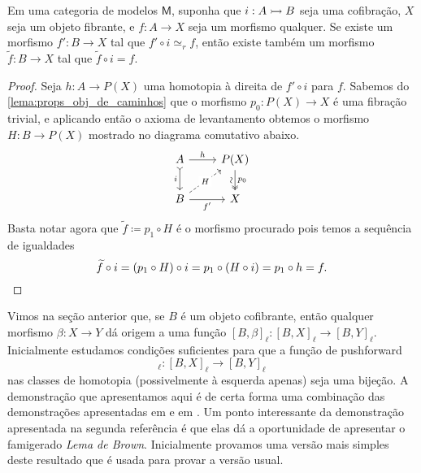 \begin{lema}
  \label{lema:extensao_a_menos_de_homotopia}
  Em uma categoria de modelos $\mathsf{M}$, suponha que $i: A \rightarrowtail B$ seja uma cofibração, $X$ seja um objeto fibrante, e $f: A \to X$ seja um morfismo qualquer.
  Se existe um morfismo $f': B \to X$ tal que $f' \circ i \simeq_{r} f$, então existe também um morfismo $\widetilde{f}: B \to X$ tal que $\widetilde{f} \circ i = f$.
\end{lema}

\begin{proof}
  Seja $h: A \to P(X)$ uma homotopia à direita de $f' \circ i $ para $f$.
  Sabemos do \cref{lema:props_obj_de_caminhos} que o morfismo $p_{0}: P(X) \to X$ é uma fibração trivial, e aplicando então o axioma de levantamento obtemos o morfismo $H: B \to P(X)$ mostrado no diagrama comutativo abaixo.
  \begin{displaymath}
    \begin{tikzcd}
      A
      \arrow[d, tail, "i" swap]
      \arrow[r, "h"]
      & P(X)
      \arrow[d, two heads, "p_{0}", "\sim" {swap,sloped}]
      \\ B
      \arrow[r, "f'" swap]
      \arrow[ru, dashed, "H" description]
      & X
    \end{tikzcd}
  \end{displaymath}
  Basta notar agora que $\widetilde{f} \coloneqq p_{1} \circ H$ é o morfismo procurado pois temos a sequência de igualdades
  \begin{displaymath}
    \widetilde{f} \circ i = (p_{1} \circ H) \circ i = p_{1} \circ (H \circ i) = p_{1} \circ h = f. \qedhere
  \end{displaymath}
\end{proof}

Vimos na seção anterior que, se $B$ é um objeto cofibrante, então qualquer morfismo $\beta: X \to Y$ dá origem a uma função $[B,\beta]_{\ell}: [B,X]_{\ell} \to [B,Y]_{\ell}$.
Inicialmente estudamos condições suficientes para que a função de pushforward
\begin{displaymath}
  [B,p]_{\ell}: [B,X]_{\ell} \to [B,Y]_{\ell}
\end{displaymath}
nas classes de homotopia (possivelmente à esquerda apenas) seja uma bijeção.
A demonstração que apresentamos aqui é de certa forma uma combinação das demonstrações apresentadas em \cite[Proposição 7.25]{heuts-moerdijk} e em \cite[Proposição 1.2.5]{hovey}.
Um ponto interessante da demonstração apresentada na segunda referência é que elas dá a oportunidade de apresentar o famigerado \emph{Lema de Brown}.
Inicialmente provamos uma versão mais simples deste resultado que é usada para provar a versão usual.

